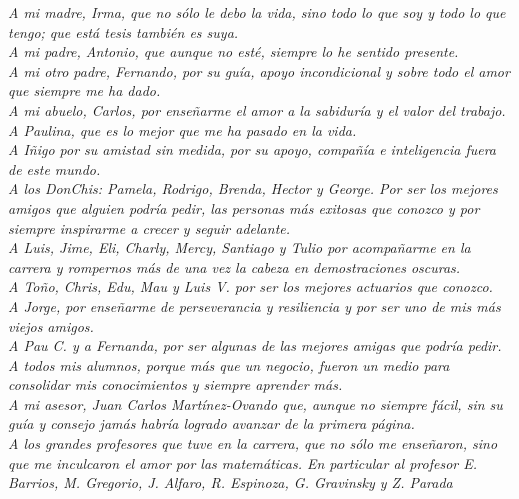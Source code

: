 \documentclass[../Main/Main.tex]{subfiles}
\begin{document}
\thispagestyle{empty}
\setcounter{page}{0} %
\begin{flushright}
	\null{}
	\emph{A mi madre, Irma, que no sólo le debo la vida, sino todo lo que soy y todo lo que tengo; que está tesis también es suya.} 
	\\
	\emph{A mi padre, Antonio, que aunque no esté, siempre lo he sentido presente.} 
	\\
	\emph{A mi otro padre, Fernando, por su guía, apoyo incondicional y sobre todo el amor que siempre me ha dado.}
	\\
	\emph{A mi abuelo, Carlos, por enseñarme el amor a la sabiduría y el valor del trabajo.}	
	\\
	\emph{A Paulina, que es lo mejor que me ha pasado en la vida.}
	\\
	\emph{A Iñigo por su amistad sin medida, por su apoyo, compañía e inteligencia fuera de este mundo.}
	\\
	\emph{A los DonChis: Pamela, Rodrigo, Brenda, Hector y George. Por ser los mejores amigos que alguien podría pedir, las personas más exitosas que conozco y por siempre inspirarme a crecer y seguir adelante.}
	\\
	\emph{A Luis, Jime, Eli, Charly, Mercy, Santiago y Tulio por acompañarme en la carrera y rompernos más de una vez la cabeza en demostraciones oscuras.}
	\\
	\emph{A Toño, Chris, Edu, Mau y Luis V. por ser los mejores actuarios que conozco.}
	\\
	\emph{A Jorge, por enseñarme de perseverancia y resiliencia y por ser uno de mis más viejos amigos.}
	\\
	\emph{A Pau C. y a Fernanda, por ser algunas de las mejores amigas que podría pedir.}
	\\
	\emph{A todos mis alumnos, porque más que un negocio, fueron un medio para consolidar mis conocimientos y siempre aprender más.}
	\\
	\emph{A mi asesor, Juan Carlos Martínez-Ovando que, aunque no siempre fácil,  sin su guía y consejo jamás habría logrado avanzar de la primera página.}	
	\\
	\emph{A los grandes profesores que tuve en la carrera, que no sólo me enseñaron, sino que me inculcaron el amor por las matemáticas. En particular al profesor E. Barrios, M. Gregorio, J. Alfaro, R. Espinoza, G. Gravinsky y Z. Parada}

\end{flushright}
\end{document}
